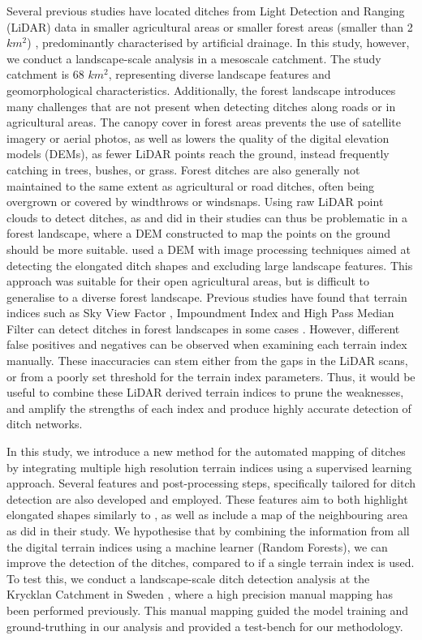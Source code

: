 \documentclass[11pt, review]{elsarticle} %
\begin{document}
Several previous studies have located ditches from Light Detection and Ranging (LiDAR) data in smaller agricultural areas \citep{roelens, bailly} or smaller forest areas (smaller than 2 $km^2$) \citep{rapinel, kiss}, predominantly characterised by artificial drainage. In this study, however, we conduct a landscape-scale analysis in a mesoscale catchment. The study  catchment  is 68 $km^2$, representing diverse landscape features and geomorphological characteristics. Additionally, the forest landscape introduces many challenges that are not present when detecting ditches along roads or in agricultural areas. The canopy cover in forest areas prevents the use of satellite imagery or aerial photos, as well as lowers the quality of the digital elevation models (DEMs), as fewer LiDAR points reach the ground, instead frequently catching in trees, bushes, or grass. Forest ditches are also generally not maintained to the same extent as agricultural or road ditches, often being overgrown or covered by windthrows or windsnaps. Using raw LiDAR point clouds to detect ditches, as \citet{roelens} and \citet{bailly} did in their studies can thus be problematic in a forest landscape, where a DEM constructed to map the points on the ground should be more suitable. \citet{cazorzi} used a DEM with image processing techniques aimed at detecting the elongated ditch shapes and excluding large landscape features. This approach was suitable for their open agricultural areas, but is difficult to generalise to a diverse forest landscape. Previous studies have found that terrain indices such as Sky View Factor \citep{zaksek}, Impoundment Index \citep{whiteboxtools} and High Pass Median Filter \citep{whiteboxtools} can detect ditches in forest landscapes in some cases \citep{uppsala}. However, different false positives and negatives can be observed when examining each terrain index manually. These inaccuracies can stem either from the gaps in the LiDAR scans, or from a poorly set threshold for the terrain index parameters. Thus, it would be useful to combine these LiDAR derived terrain indices to prune the weaknesses, and amplify the strengths of each index and produce highly accurate detection of ditch networks. 

In this study, we introduce a new method for the automated mapping of ditches by integrating multiple high resolution terrain indices using a supervised learning approach. Several features and post-processing steps, specifically tailored for ditch detection are also developed and employed. These features aim to both highlight elongated shapes similarly to \citet{cazorzi}, as well as include a map of the neighbouring area as \citet{roelens} did in their study. We hypothesise that by combining the information from all the digital terrain indices using a machine learner (Random Forests), we can improve the detection of the ditches, compared to if a single terrain index is used. To test this, we conduct a landscape-scale ditch detection analysis at the Krycklan Catchment in Sweden \citep{krycklancatchment}, where a high precision manual mapping has been performed previously. This manual mapping guided the model training and ground-truthing in our analysis and provided a test-bench for our methodology.
\end{document}
